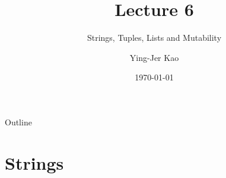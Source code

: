 \documentclass{beamer}
\title[Strings, Tuples, Lists and Mutability] %
{Lecture 6}
\subtitle
{Strings, Tuples, Lists and Mutability} %
\author[Ying-Jer Kao] %
{Ying-Jer Kao}
\institute[National Taiwan University] %
{
  Department of Physics\\
 National Taiwan University
  }
\date[Numerical Analysis and Programming] %
{\today}
\begin{document}
\begin{frame}
  \titlepage
\end{frame}

\begin{frame}{Outline}
  \tableofcontents
\end{frame}



\section{Strings}
\end{document}
